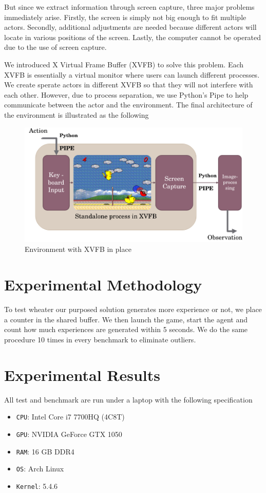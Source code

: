 \documentclass[sigconf]{acmart}
\begin{document}
But since we extract information through screen capture, three major problems immediately arise. Firstly, the screen is simply not big enough to fit multiple actors. Secondly, additional adjustments are needed because different actors will locate in various positions of the screen. Lastly, the computer cannot be operated due to the use of screen capture.

We introduced X Virtual Frame Buffer (XVFB) to solve this problem. Each XVFB is essentially a virtual monitor where users can launch different processes. We create sperate actors in different XVFB so that they will not interfere with each other. However, due to process separation, we use Python's Pipe to help communicate between the actor and the environment. The final architecture of the environment is illustrated as the following
\begin{figure}[h]
  \centering
  \includegraphics[width=\columnwidth]{xvfb.png}
  \caption{Environment with XVFB in place}
\end{figure}

\section{Experimental Methodology}
To test wheater our purposed solution generates more experience or not, we place a counter in the shared buffer. We then launch the game, start the agent and count how much experiences are generated within 5 seconds. We do the same procedure 10 times in every benchmark to eliminate outliers.

\section{Experimental Results}
All test and benchmark are run under a laptop with the following specification
\begin{itemize}
\item {\verb|CPU|}: Intel Core i7 7700HQ (4C8T)
\item {\verb|GPU|}: NVIDIA GeForce GTX 1050
\item {\verb|RAM|}: 16 GB DDR4
\item {\verb|OS|}: Arch Linux
\item {\verb|Kernel|}: 5.4.6
\end{itemize}
\end{document}
